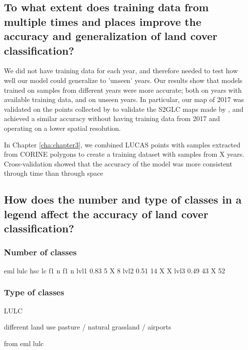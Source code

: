     
    \subsection{To what extent does training data from multiple times and places improve the accuracy and generalization of land cover classification?}
    
    We did not have training data for each year, and therefore needed to test how well our model could generalize to 'unseen' years. Our results show that models trained on samples from different years were more accurate; both on years with available training data, and on unseen years. In particular, our map of 2017 was validated on the points collected by \citep{jenerowicz2021validation} to validate the S2GLC maps made by \citet{malinowski2020automated}, and achieved a similar accuracy without having training data from 2017 and operating on a lower spatial resolution.
    
    In Chapter \ref{cha:chapter3}, we combined LUCAS points with samples extracted from CORINE polygons to create a training dataset with samples from X years. Cross-validation showed that the accuracy of the model was more consistent through time than through space
    
    \subsection{How does the number and type of classes in a legend affect the accuracy of land cover classification?}
    
    \subsubsection{Number of classes}
    
    
            eml lulc        hsc lc
            f1      n       f1  n
    lvl1    0.83    5       X   8
    lvl2    0.51    14      X   X
    lvl3    0.49    43      X   52
    
    
    
    \subsubsection{Type of classes}
    
    LULC
    
    different land use
    pasture / natural grassland / airports
    
    from eml lulc
    
